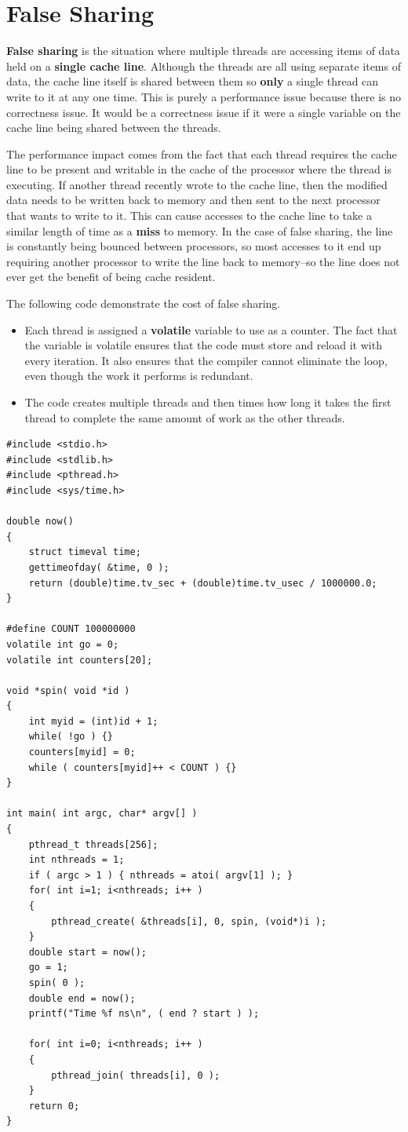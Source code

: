 \documentclass[12pt,a4paper]{report}
\begin{document}
\section{False Sharing}
\textbf{False sharing} is the situation where multiple threads are accessing items of data held on a \textbf{single cache line}. Although the threads are all using separate items of data, the cache line itself is shared between them so \textbf{only} a single thread can write to it at any one time. This is purely a performance issue because there is no correctness issue. It would be a correctness issue if it were a single variable on the cache line being shared between the threads.
\par
The performance impact comes from the fact that each thread requires the cache line to be present and writable in the cache of the processor where the thread is executing. If another thread recently wrote to the cache line, then the modified data needs to be written back to memory and then sent to the next processor that wants to write to it. This can cause accesses to the cache line to take a similar length of time as a \textbf{miss} to memory. In the case of false sharing, the line is constantly being bounced between processors, so most accesses to it end up requiring another processor to write the line back to memory--so the line does not ever get the benefit of being cache resident.
\par
The following code demonstrate the cost of false sharing.
\begin{itemize}
	\item Each thread is assigned a \textbf{volatile} variable to use as a counter. The fact that the variable is volatile ensures that the code must store and reload it with every iteration. It also ensures that the compiler cannot eliminate the loop, even though the work it performs is redundant. 
	\item The code creates multiple threads and then times how long it takes the first thread to complete the same amount of work as the other threads.
\end{itemize}
\begin{lstlisting}
#include <stdio.h>
#include <stdlib.h>
#include <pthread.h>
#include <sys/time.h>

double now()
{
	struct timeval time;
	gettimeofday( &time, 0 );
	return (double)time.tv_sec + (double)time.tv_usec / 1000000.0;
}

#define COUNT 100000000
volatile int go = 0;
volatile int counters[20];

void *spin( void *id )
{
	int myid = (int)id + 1;
	while( !go ) {}
	counters[myid] = 0;
	while ( counters[myid]++ < COUNT ) {}
}

int main( int argc, char* argv[] )
{
	pthread_t threads[256];
	int nthreads = 1;
	if ( argc > 1 ) { nthreads = atoi( argv[1] ); }
	for( int i=1; i<nthreads; i++ )
	{
		pthread_create( &threads[i], 0, spin, (void*)i );
	}
	double start = now();
	go = 1;
	spin( 0 );
	double end = now();
	printf("Time %f ns\n", ( end ? start ) );
	
	for( int i=0; i<nthreads; i++ )
	{
		pthread_join( threads[i], 0 );
	}
	return 0;
}
\end{lstlisting}
\end{document}

